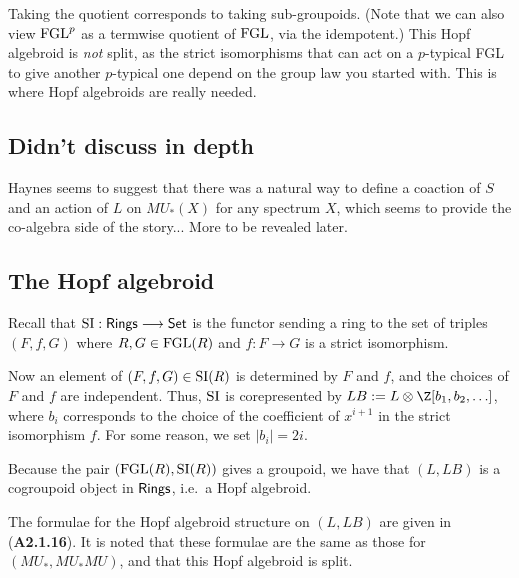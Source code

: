 \documentclass[11pt]{article}
\newcommand{\FGL}{\textup{FGL}}
\newcommand{\FGLp}{\textup{FGL}^{p}}
\newcommand{\SI}{\textup{SI}}
\newcommand{\Ring}{\textsf{Rings}}
\begin{document}
\begin{Formal Group Laws}
\begin{shaded}
Taking the quotient corresponds to taking sub-groupoids. (Note that we can also view $\FGLp$ as a termwise quotient of $\FGL$, via the idempotent.) This Hopf algebroid is \emph{not} split, as the strict isomorphisms that can act on a $p$-typical FGL to give another $p$-typical one depend on the group law you started with. This is where Hopf algebroids are really needed.
\subsection*{Didn't discuss in depth}
Haynes seems to suggest that there was a natural way to define a coaction of $S$ and an action of $L$ on $MU_*(X)$ for any spectrum $X$, which seems to provide the co-algebra side of the story... More to be revealed later.


\end{shaded}

\subsection*{The Hopf algebroid}
Recall that $\SI:\Ring\to\Set$ is the functor sending a ring to the set of triples $(F,f,G)$ where $R,G\in\FGL(R)$ and $f:F\to G$ is a strict isomorphism.

Now an element of $(F,f,G)\in\SI(R)$ is determined by $F$ and $f$, and the choices of $F$ and $f$ are independent. Thus, $\SI$ is corepresented by $LB:=L\otimes\Z[b_1,b_2,\ldots]$, where $b_i$ corresponds to the choice of the coefficient of $x^{i+1}$ in the strict isomorphism $f$. For some reason, we set $|b_i|=2i$.

Because the pair $(\FGL(R),\SI(R))$ gives a groupoid, we have that $(L,LB)$ is a cogroupoid object in $\operatorname{{\mathsf{Rings}}}$, i.e.\ a Hopf algebroid.
\begin{itemise}
\item The formulae for the Hopf algebroid structure on $(L,LB)$ are given in (\textbf{A2.1.16}). It is noted that these formulae are the same as those for $(MU_*,MU_*MU)$, and that this Hopf algebroid is split.
\end{itemise}

\end{Formal Group Laws}
\end{document}
